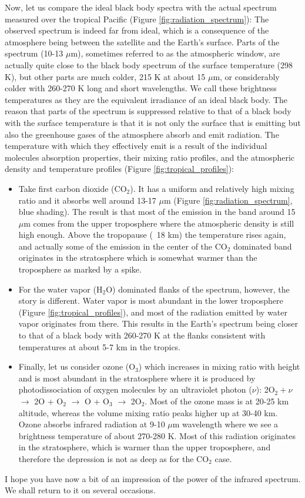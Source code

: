 \documentclass[12pt]{book}
\begin{document}
Now, let us compare the ideal black body spectra with the actual spectrum measured over the tropical Pacific (Figure \ref{fig:radiation_spectrum}): The observed spectrum is indeed far from ideal, which is a consequence of the atmosphere being between the satellite and the Earth's surface. Parts of the spectrum (10-13 $\mu$m), sometimes referred to as the atmospheric window, are actually quite close to the black body spectrum of the surface temperature (298 K), but other parts are much colder, 215 K at about 15 $\mu$m, or considerably colder with 260-270 K long and short wavelengths. We call these brightness temperatures as they are the equivalent irradiance of an ideal black body.
The reason that parts of the spectrum is suppressed relative to that of a black body with the surface temperature is that it is not only the surface that is emitting but also the greenhouse gases of the atmosphere absorb and emit radiation. The temperature with which they effectively emit is a result of the individual molecules absorption properties, their mixing ratio profiles, and the atmospheric density and temperature profiles (Figure \ref{fig:tropical_profiles}):
\begin{itemize}
\item
Take first carbon dioxide (CO$_2$). It has a uniform and relatively high mixing ratio and it absorbs well around 13-17 $\mu$m (Figure \ref{fig:radiation_spectrum}, blue shading). The result is that most of the emission in the band around 15 $\mu$m comes from the upper troposphere where the atmospheric density is still high enough. Above the tropopause (~18 km) the temperature rises again, and actually some of the emission in the center of the CO$_2$ dominated band originates in the stratosphere which is somewhat warmer than the troposphere as marked by a spike. 
\item
For the water vapor (H$_2$O) dominated flanks of the spectrum, however, the story is different. Water vapor is most abundant in the lower troposphere (Figure \ref{fig:tropical_profiles}), and most of the radiation emitted by water vapor originates from there. This results in the Earth's spectrum being closer to that of a black body with 260-270 K at the flanks consistent with temperatures at about 5-7 km in the tropics.
\item
Finally, let us consider ozone (O$_3$) which increases in mixing ratio with height and is most abundant in the stratosphere where it is produced by photodissociation of oxygen molecules by an ultraviolet photon ($\nu$): 2O$_2 +\nu$ $\rightarrow$ 2O + O$_2$ $\rightarrow$ O + O$_3$ $\rightarrow$ 2O$_2$. Most of the ozone mass is at 20-25 km altitude, whereas the volume mixing ratio peaks higher up at 30-40 km. Ozone absorbs infrared radiation at 9-10 $\mu$m wavelength where we see a brightness temperature of about 270-280 K. Most of this radiation originates in the stratosphere, which is warmer than the upper troposphere, and therefore the depression is not as deep as for the CO$_2$ case.
\end{itemize}
I hope you have now a bit of an impression of the power of the infrared spectrum. We shall return to it on several occasions. 
\end{document}
